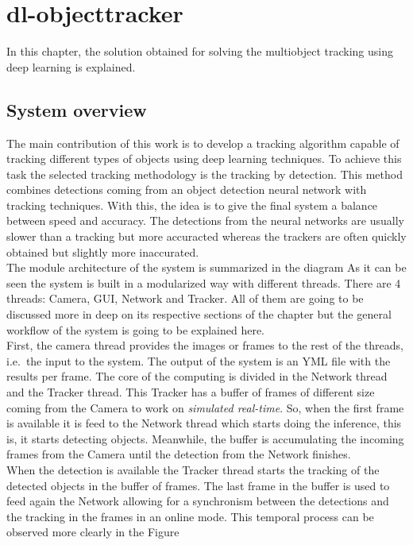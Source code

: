 \chapter{dl-objecttracker}
In this chapter, the solution obtained for solving the multiobject tracking using deep learning is explained.

\section{System overview}
The main contribution of this work is to develop a tracking algorithm capable of tracking different types of objects using deep learning techniques. To achieve this task the selected tracking methodology is the tracking by detection. This method combines detections coming from an object detection neural network with tracking techniques. With this, the idea is to give the final system a balance between speed and accuracy. The detections from the neural networks are usually slower than a tracking but more accuracted whereas the trackers are often quickly obtained but slightly more inaccurated.\\
The module architecture of the system is summarized in the diagram %
As it can be seen the system is built in a modularized way with different threads. There are 4 threads: Camera, GUI, Network and Tracker. All of them are going to be discussed more in deep on its respective sections of the chapter but the general workflow of the system is going to be explained here.\\
First, the camera thread provides the images or frames to the rest of the threads, i.e.\ the input to the system. The output of the system is an YML file with the results per frame. The core of the computing is divided in the Network thread and the Tracker thread. This Tracker has a buffer of frames of different size coming from the Camera to work on \textit{simulated real-time}. So, when the first frame is available it is feed to the Network thread which starts doing the inference, this is, it starts detecting objects. Meanwhile, the buffer is accumulating the incoming frames from the Camera until the detection from the Network finishes.\\
When the detection is available the Tracker thread starts the tracking of the detected objects in the buffer of frames. The last frame in the buffer is used to feed again the Network allowing for a synchronism between the detections and the tracking in the frames in an online mode. This temporal process can be  observed more clearly in the Figure %
